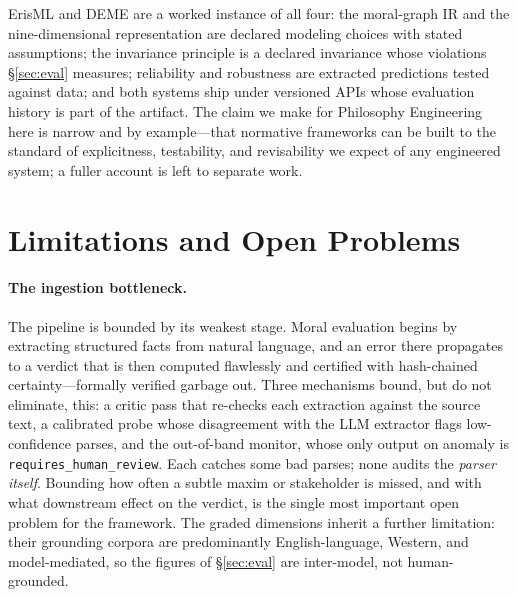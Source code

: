 ErisML and DEME are a worked instance of all four: the moral-graph IR and the nine-dimensional
representation are declared modeling choices with stated assumptions; the invariance principle
is a declared invariance whose violations \S\ref{sec:eval} measures; reliability and robustness
are extracted predictions tested against data; and both systems ship under versioned APIs whose
evaluation history is part of the artifact. The claim we make for Philosophy Engineering here is
narrow and by example---that normative frameworks can be built to the standard of explicitness,
testability, and revisability we expect of any engineered system; a fuller account is left to
separate work.

\section{Limitations and Open Problems}
\label{sec:limits}

\paragraph{The ingestion bottleneck.} The pipeline is bounded by its weakest stage. Moral
evaluation begins by extracting structured facts from natural language, and an error there
propagates to a verdict that is then computed flawlessly and certified with hash-chained
certainty---formally verified garbage out. Three mechanisms bound, but do not eliminate, this:
a critic pass that re-checks each extraction against the source text, a calibrated probe whose
disagreement with the LLM extractor flags low-confidence parses, and the out-of-band monitor,
whose only output on anomaly is \texttt{requires\_human\_review}. Each catches some bad parses;
none audits the \emph{parser itself}. Bounding how often a subtle maxim or stakeholder is
missed, and with what downstream effect on the verdict, is the single most important open
problem for the framework. The graded dimensions inherit a further limitation: their grounding
corpora are predominantly English-language, Western, and model-mediated, so the figures of
\S\ref{sec:eval} are inter-model, not human-grounded.

